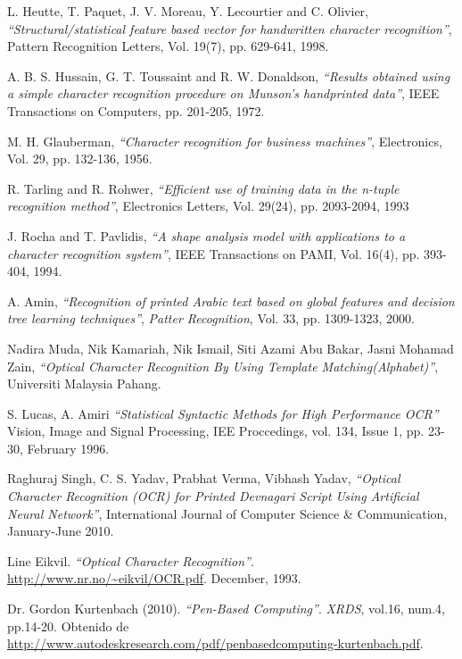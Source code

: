 \begin{thebibliography}{100}
		
		L. Heutte, T. Paquet, J. V. Moreau, Y. Lecourtier and C. Olivier,
		\emph{``Structural/statistical feature based vector for handwritten character recognition''},
		Pattern Recognition Letters,
		Vol. 19(7), pp. 629-641,
		1998.
		
		A. B. S. Hussain, G. T. Toussaint and R. W. Donaldson,
		\emph{``Results obtained using a simple character recognition procedure on Munson’s handprinted data''},
		IEEE Transactions on Computers, pp. 201-205,
		1972.
		
		M. H. Glauberman,
		\emph{``Character recognition for business
machines''},
		Electronics,
		Vol. 29, pp. 132-136,
		1956.
		
		R. Tarling and R. Rohwer,
		\emph{``Efficient use of training data in
the n-tuple recognition method''},
		Electronics Letters,
		Vol. 29(24), pp. 2093-2094,
		1993
		
		J. Rocha and T. Pavlidis,
		\emph{``A shape analysis model with applications to a character recognition system''},
		IEEE Transactions on PAMI,
		Vol. 16(4), pp. 393-404, 
		1994.
		
		A. Amin,
		\emph{``Recognition of printed Arabic text based on global features and decision tree learning techniques''},
		\textit{Patter Recognition},
		Vol. 33, pp. 1309-1323,
		2000.
	
		Nadira Muda, Nik Kamariah, Nik Ismail, Siti Azami Abu Bakar, Jasni Mohamad Zain,
		\emph{``Optical Character Recognition By Using Template Matching(Alphabet)''},
		Universiti Malaysia Pahang.
		
		S. Lucas, A. Amiri
		\emph{``Statistical Syntactic Methods for High Performance OCR''}
		Vision, Image and Signal Processing, IEE Proccedings,
		vol. 134, Issue 1, pp. 23-30,
		February 1996.
		
		Raghuraj Singh, C. S. Yadav, Prabhat Verma, Vibhash Yadav,
		\emph{``Optical Character Recognition (OCR) for Printed Devnagari Script Using Artificial Neural Network''},
		International Journal of Computer Science \& Communication,
		January-June  2010.
	
		Line Eikvil.
		\emph{``Optical Character Recognition''}.
		\url{http://www.nr.no/~eikvil/OCR.pdf}.
		December, 1993.
		
		Dr. Gordon Kurtenbach (2010).
		\emph{``Pen-Based Computing''}.
		\emph{XRDS}, vol.16, num.4, pp.14-20.
		Obtenido de \url{http://www.autodeskresearch.com/pdf/penbasedcomputing-kurtenbach.pdf}.
		

\end{thebibliography}
